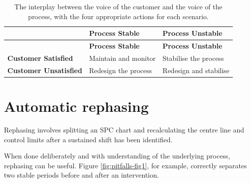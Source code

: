 \documentclass[
]{book}
\begin{document}
\begin{longtable}[]{@{}
  >{\raggedright\arraybackslash}p{}
  >{\raggedright\arraybackslash}p{}
  >{\raggedright\arraybackslash}p{}@{}}
\caption{\label{tab:pitfalls-tab1} The interplay between the voice of the customer and the voice of the process, with the four appropriate actions for each scenario.}\tabularnewline
\toprule\noalign{}
\begin{minipage}[b]{\linewidth}\raggedright
\end{minipage} & \begin{minipage}[b]{\linewidth}\raggedright
\textbf{Process Stable}
\end{minipage} & \begin{minipage}[b]{\linewidth}\raggedright
\textbf{Process Unstable}
\end{minipage} \\
\midrule\noalign{}
\endfirsthead
\toprule\noalign{}
\begin{minipage}[b]{\linewidth}\raggedright
\end{minipage} & \begin{minipage}[b]{\linewidth}\raggedright
\textbf{Process Stable}
\end{minipage} & \begin{minipage}[b]{\linewidth}\raggedright
\textbf{Process Unstable}
\end{minipage} \\
\midrule\noalign{}
\endhead
\bottomrule\noalign{}
\endlastfoot
\textbf{Customer Satisfied} & Maintain and monitor & Stabilise the process \\
\textbf{Customer Unsatisfied} & Redesign the process & Redesign and stabilise \\
\end{longtable}

\section{Automatic rephasing}\label{automatic-rephasing}

Rephasing involves splitting an SPC chart and recalculating the centre line and control limits after a sustained shift has been identified.

When done deliberately and with understanding of the underlying process, rephasing can be useful. Figure \ref{fig:pitfalls-fig1}, for example, correctly separates two stable periods before and after an intervention.
\end{document}
